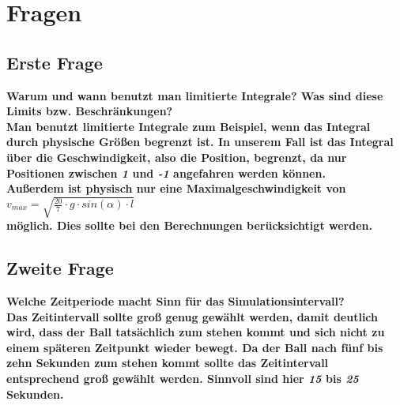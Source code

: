 \section{Fragen}
\subsection{Erste Frage}
\bfseries Warum und wann benutzt man limitierte Integrale? Was sind diese Limits bzw. Beschränkungen? \\
\mdseries Man benutzt limitierte Integrale zum Beispiel, wenn das Integral durch physische Größen begrenzt ist. In unserem Fall ist das Integral über die Geschwindigkeit, also die Position, begrenzt, da nur Positionen zwischen \textit{1} und \textit{-1} angefahren werden können. \\
Außerdem ist physisch nur eine Maximalgeschwindigkeit von \\
$v_{max} = \sqrt{\frac{20}{7}\cdot g\cdot sin(\alpha)\cdot l}$ \\
möglich. Dies sollte bei den Berechnungen berücksichtigt werden.

\subsection{Zweite Frage}
\bfseries Welche Zeitperiode macht Sinn für das Simulationsintervall? \\
\mdseries Das Zeitintervall sollte groß genug gewählt werden, damit deutlich wird, dass der Ball tatsächlich zum stehen kommt und sich nicht zu einem späteren Zeitpunkt wieder bewegt. Da der Ball nach fünf bis zehn Sekunden zum stehen kommt sollte das Zeitintervall entsprechend groß gewählt werden. Sinnvoll sind hier \textit{15} bis \textit{25} Sekunden.